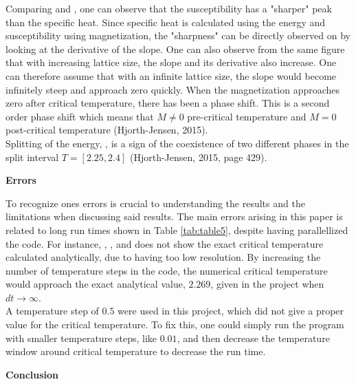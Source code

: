 \documentclass[10pt,a4paper]{article}
\begin{document}
\noindent Comparing  and , one can observe that the susceptibility has a "sharper" peak than the specific heat. Since specific heat is calculated using the energy and susceptibility using magnetization, the "sharpness" can be directly observed on  by looking at the derivative of the slope. One can also observe from the same figure that with increasing lattice size, the slope and its derivative also increase. One can therefore assume that with an infinite lattice size, the slope would become infinitely steep and approach zero quickly. When the magnetization approaches zero after critical temperature, there has been a phase shift. This is a second order phase shift which means that $M \neq 0$ pre-critical temperature and $M = 0$ post-critical temperature (Hjorth-Jensen, 2015).\\

\noindent Splitting of the energy, , is a sign of the coexistence of two different phases in the split interval $T = [2.25, 2.4]$ (Hjorth-Jensen, 2015, page 429). \\


\begin{center}
{\LARGE\bf Errors}
\end{center}

\noindent To recognize ones errors is crucial to understanding the results and the limitations when discussing said results. The main errors arising in this paper is related to long run times shown in Table \ref{tab:table5}, despite having parallellized the code. For instance, , ,  and  does not show the exact critical temperature calculated analytically, due to having too low resolution. By increasing the number of temperature steps in the code, the numerical critical temperature would approach the exact analytical value, $2.269$, given in the project when $dt \rightarrow \infty$.\\

\noindent A temperature step of $0.5$ were used in this project, which did not give a proper value for the critical temperature. To fix this, one could simply run the program with smaller temperature steps, like $0.01$, and then decrease the temperature window around critical temperature to decrease the run time.

\begin{center}
{\LARGE\bf Conclusion}
\end{center}
\end{document}

